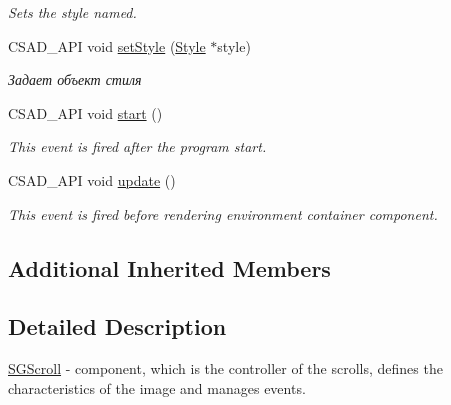 \begin{DoxyCompactItemize}
\begin{DoxyCompactList}\small\item\em Sets the style named. \end{DoxyCompactList}\item 
\hypertarget{classcsad_1_1_s_g_scroll_adde70cbc4a41c13a6e9abf6ea02aa786}{C\-S\-A\-D\-\_\-\-A\-P\-I void \hyperlink{classcsad_1_1_s_g_scroll_adde70cbc4a41c13a6e9abf6ea02aa786}{set\-Style} (\hyperlink{classcsad_1_1_style}{Style} $\ast$style)}\label{classcsad_1_1_s_g_scroll_adde70cbc4a41c13a6e9abf6ea02aa786}

\begin{DoxyCompactList}\small\item\em Задает объект стиля \end{DoxyCompactList}\item 
\hypertarget{classcsad_1_1_s_g_scroll_a0ac81135777ee1f12b92df6fa82133c9}{C\-S\-A\-D\-\_\-\-A\-P\-I void \hyperlink{classcsad_1_1_s_g_scroll_a0ac81135777ee1f12b92df6fa82133c9}{start} ()}\label{classcsad_1_1_s_g_scroll_a0ac81135777ee1f12b92df6fa82133c9}

\begin{DoxyCompactList}\small\item\em This event is fired after the program start. \end{DoxyCompactList}\item 
\hypertarget{classcsad_1_1_s_g_scroll_aad3aeb52dc14de4116fc9f855723c97f}{C\-S\-A\-D\-\_\-\-A\-P\-I void \hyperlink{classcsad_1_1_s_g_scroll_aad3aeb52dc14de4116fc9f855723c97f}{update} ()}\label{classcsad_1_1_s_g_scroll_aad3aeb52dc14de4116fc9f855723c97f}

\begin{DoxyCompactList}\small\item\em This event is fired before rendering environment container component. \end{DoxyCompactList}\end{DoxyCompactItemize}
\subsection*{Additional Inherited Members}


\subsection{Detailed Description}
\hyperlink{classcsad_1_1_s_g_scroll}{S\-G\-Scroll} -\/ component, which is the controller of the scrolls, defines the characteristics of the image and manages events. 

